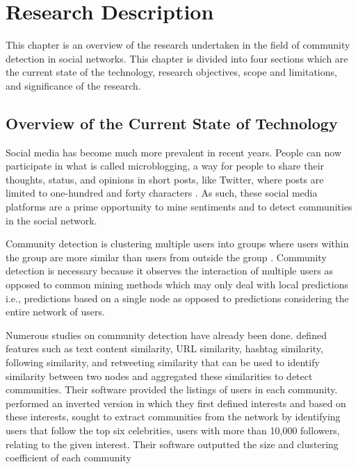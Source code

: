 %
%
%                 

\chapter{Research Description}
\label{sec:researchdesc}

This chapter is an overview of the research undertaken in the field of community detection in social networks. 
This chapter is divided into four sections which are the current state of the technology, research objectives, scope and limitations, and significance of the research.

\section{Overview of the Current State of Technology}
\label{sec:overview}

Social media has become much more prevalent in recent years. People can now participate in what is called microblogging, a way for people to share their thoughts, status, and opinions in short posts, like Twitter, where posts are limited to one-hundred and forty characters \cite{Java:2007}. As such, these social media platforms are a prime opportunity to mine sentiments and to detect communities in the social network. 

Community detection is clustering multiple users into groups where users within the group are more similar than users from outside the group \cite{Tang:2010}. Community detection is necessary because it observes the interaction of multiple users as opposed to common mining methods which may only deal with local predictions i.e., predictions based on a single node as opposed to predictions considering the entire network of users. 

Numerous studies on community detection have already been done.  defined features such as text content similarity, URL similarity, hashtag similarity, following similarity, and retweeting similarity that can be used to identify similarity between two nodes and aggregated these similarities to detect communities. Their software provided the listings of users in each community.  performed an inverted version in which they first defined interests and based on these interests, sought to extract communities from the network by identifying users that follow the top six celebrities, users with more than 10,000 followers, relating to the given interest. Their software outputted the size and clustering coefficient of each community 

